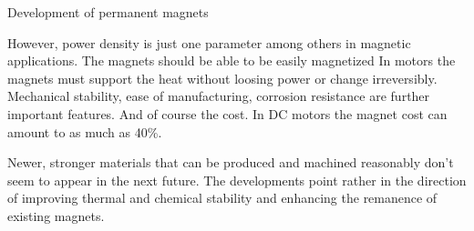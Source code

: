 \documentclass[compress]{beamer}
\begin{document}
\begin{frame}{Development of permanent magnets}
{        However, power density is just one parameter among others in magnetic
        applications.
        The magnets should be able to be easily magnetized
        In motors the magnets must support the heat without loosing power or
        change irreversibly.
        Mechanical stability, ease of manufacturing, corrosion resistance are
        further important features.
        And of course the cost. In DC motors the magnet cost can amount to as
        much as 40\%.

        Newer, stronger materials that can be produced and machined reasonably
        don't seem to appear in the next future. The developments point rather
        in the direction of improving thermal and chemical stability and
        enhancing the remanence of existing magnets.
    }
\end{frame}

%
%
%
%
%
%
%
\end{document}
